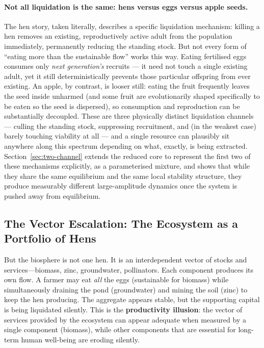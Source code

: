 \documentclass[twocolumn,10pt]{article}
\begin{document}
\paragraph{Not all liquidation is the same: hens versus eggs versus apple seeds.} The hen story, taken literally, describes a specific liquidation mechanism: killing a hen removes an existing, reproductively active adult from the population immediately, permanently reducing the standing stock. But not every form of ``eating more than the sustainable flow'' works this way. Eating fertilised eggs consumes only \emph{next generation's} recruits — it need not touch a single existing adult, yet it still deterministically prevents those particular offspring from ever existing. An apple, by contrast, is looser still: eating the fruit frequently leaves the seed inside unharmed (and some fruit are evolutionarily shaped specifically to be eaten so the seed is dispersed), so consumption and reproduction can be substantially decoupled. These are three physically distinct liquidation channels — culling the standing stock, suppressing recruitment, and (in the weakest case) barely touching viability at all — and a single resource can plausibly sit anywhere along this spectrum depending on what, exactly, is being extracted. Section~\ref{sec:two-channel} extends the reduced core to represent the first two of these mechanisms explicitly, as a parameterised mixture, and shows that while they share the same equilibrium and the same local stability structure, they produce measurably different large-amplitude dynamics once the system is pushed away from equilibrium.

\subsection{The Vector Escalation: The Ecosystem as a Portfolio of Hens}
\label{sec:productivity-illusion-narrative}
But the biosphere is not one hen. It is an interdependent vector of stocks and services---biomass, zinc, groundwater, pollinators. Each component produces its own flow. A farmer may eat \emph{all} the eggs (sustainable for biomass) while simultaneously draining the pond (groundwater) and mining the soil (zinc) to keep the hen producing. The aggregate appears stable, but the supporting capital is being liquidated silently. This is the \textbf{productivity illusion}: the vector of services provided by the ecosystem can appear adequate when measured by a single component (biomass), while other components that are essential for long-term human well-being are eroding silently.
\end{document}
